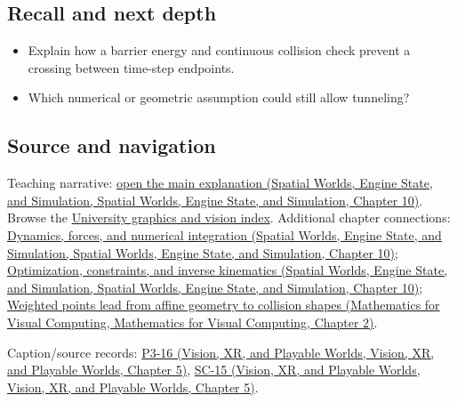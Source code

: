 \subsection{Recall and next depth}\label{appendix-a9ba01fa72a6-recall-and-next-depth}

\begin{itemize}
\tightlist
\item
  Explain how a barrier energy and continuous collision check prevent a crossing between time-step endpoints.
\item
  Which numerical or geometric assumption could still allow tunneling?
\end{itemize}

\subsection{Source and navigation}\label{appendix-a9ba01fa72a6-source-and-navigation}

Teaching narrative: \href{../05-Spatial-Worlds-Engine-State-and-Simulation/main.pdf\#nameddest=04-visual-computing-ii-ch029-dynamics-forces-and-numerical-integration}{open the main explanation (Spatial Worlds, Engine State, and Simulation, Spatial Worlds, Engine State, and Simulation, Chapter 10)}. Browse the \hyperref[appendix-a6d556a4ef50-university-graphics-vision-and-photography---independent-series]{University graphics and vision index}. Additional chapter connections: \href{../05-Spatial-Worlds-Engine-State-and-Simulation/main.pdf\#nameddest=04-visual-computing-ii-ch029-dynamics-forces-and-numerical-integration}{Dynamics, forces, and numerical integration (Spatial Worlds, Engine State, and Simulation, Spatial Worlds, Engine State, and Simulation, Chapter 10)}; \href{../05-Spatial-Worlds-Engine-State-and-Simulation/main.pdf\#nameddest=04-visual-computing-ii-ch029-optimization-constraints-and-inverse-kinematics}{Optimization, constraints, and inverse kinematics (Spatial Worlds, Engine State, and Simulation, Spatial Worlds, Engine State, and Simulation, Chapter 10)}; \href{../02-Mathematics-for-Visual-Computing/main.pdf\#nameddest=01-foundations-i-ch018-weighted-points-lead-from-affine-geometry-to-collision-shapes}{Weighted points lead from affine geometry to collision shapes (Mathematics for Visual Computing, Mathematics for Visual Computing, Chapter 2)}.

Caption/source records: \href{../07-Vision-XR-and-Playable-Worlds/main.pdf\#nameddest=04-visual-computing-ii-ch036-p3-16---subdivision-surfaces-part-1}{P3-16 (Vision, XR, and Playable Worlds, Vision, XR, and Playable Worlds, Chapter 5)}, \href{../07-Vision-XR-and-Playable-Worlds/main.pdf\#nameddest=04-visual-computing-ii-ch036-sc-15---stanford-cs231n-deep-learning-for-computer-vision-spring-2025-lecture-15-3d-vision}{SC-15 (Vision, XR, and Playable Worlds, Vision, XR, and Playable Worlds, Chapter 5)}.
